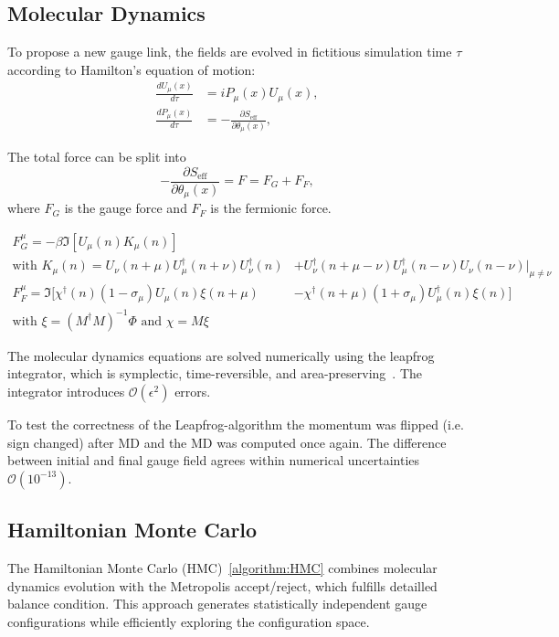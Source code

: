 \documentclass[11pt,titlepage]{article}
\begin{document}
\subsection{Molecular Dynamics}

To propose a new gauge link, the fields are evolved in fictitious simulation time $\tau$
according to Hamilton's equation of motion:
\begin{align}
\frac{dU_\mu(x)}{d\tau} &= i P_\mu(x) U_\mu(x), \\
\frac{dP_\mu(x)}{d\tau} &= 
- \frac{\partial S_{\text{eff}}}{\partial \theta_\mu(x)},
\end{align}

The total force can be split into
\begin{equation}
- \frac{\partial S_{\text{eff}}}{\partial \theta_\mu(x)}= F = F_G + F_F,
\end{equation}
where $F_G$ is the gauge force and $F_F$ is the fermionic force.

\begin{align}
    F_G^\mu = -\beta \Im[U_\mu(n)K_\mu(n)] &   \\
\textrm{with } K_\mu(n) = U_\nu(n+\mu)U_\mu^\dagger(n+\nu)U_\nu^\dagger(n) &+ U_\nu^\dagger(n+\mu-\nu) U_\mu^\dagger(n-\nu)U_\nu(n-\nu)|_{\mu \neq \nu } \\
F_F^\mu = \Im[\chi^\dagger(n)(1-\sigma_\mu)U_\mu(n)\xi(n+\mu) &- \chi^\dagger(n+\mu)(1+ \sigma_\mu)U_\mu^\dagger(n)\xi(n)]\\
\textrm{with } \xi = (M^\dagger M)^{-1}\Phi \textrm{ and } \chi = M \xi
\end{align}

The molecular dynamics equations are solved numerically
using the leapfrog integrator, which is symplectic,
time-reversible, and area-preserving~\cite{lecturenote}. The integrator introduces $\mathcal{O}(\epsilon^2)$ errors.

To test the correctness of the Leapfrog-algorithm the momentum was flipped (i.e. sign changed) after MD and the MD was computed once again. 
The difference between initial and final gauge field agrees within numerical uncertainties $\mathcal{O}(10^{-13})$.

\subsection{Hamiltonian Monte Carlo}

The Hamiltonian Monte Carlo (HMC)~\cref{algorithm:HMC} combines molecular dynamics evolution with the Metropolis accept/reject, which
fulfills detailled balance condition. 
This approach generates statistically independent gauge configurations while efficiently exploring the configuration space.
\end{document}
